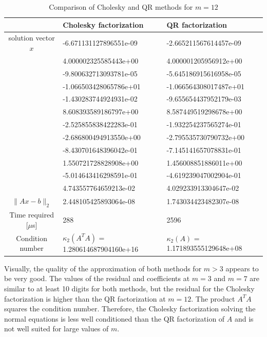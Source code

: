 \documentclass[11pt]{article} %
\begin{document}
\begin{table}[h!]
\centering
\begin{tabular}{| c | l | l | }\hline
 & Cholesky factorization & QR factorization \\ \hline
solution vector $x$ & -6.671131127896551e-09&       -2.665211567614457e-09     \\
 &    4.000002325585443e+00&         4.000001205956912e+00    \\
 &   -9.800632713093781e-05&       -5.645186915616958e-05    \\
 &   -1.066503428065786e+01&        -1.066564308017487e+01    \\
 &   -1.430283744924931e-02&       -9.655654437952179e-03     \\
&     8.608393589186797e+00&        8.587449519298678e+00     \\
&    -2.525855838422283e-01&          -1.932254237565274e-01  \\
&      -2.686800494913550e+00&      -2.795535730790732e+00    \\
&      -8.430701648396042e-01 &       -7.145141657078831e-01   \\
&       1.550721728828908e+00 &      1.456008851886011e+00     \\
&      -5.014643416298591e-01&     -4.619239047002904e-01  \\ 
&      4.743557764659213e-02 &      4.029233913304647e-02 \\ \hline
 $\|Ax - b \|_2$ &      2.448105425893064e-08&        1.743034423482307e-08 \\ \hline
Time required [$\mu$s] &  288& 2596 \\ \hline
Condition number & $\kappa_2(A^T A )$ =     1.280614687904160e+16 & $\kappa_2(A )$ =       1.171893555129648e+08
 \\ \hline
\end{tabular}
\caption{Comparison of Cholesky and QR methods for $m=12$}
\end{table}

\clearpage
Visually, the quality of the approximation of both methods for $m>3$ appears to be very good. The values of the residual and coefficients at $m=3$ and $m=7$ are similar to at least 10 digits for both methods, but the residual for the Cholesky factorization is higher than the QR factorization at $m=12$. The product $A^TA$ squares the condition number. Therefore, the Cholesky factorization solving the normal equations is less well conditioned than the QR factorization of $A$ and is not well suited for large values of $m$.
\end{document}
